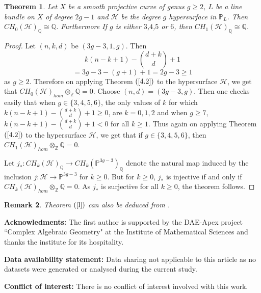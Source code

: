 \documentclass[12pt, reqno]{amsart}
\newtheorem{theorem}{Theorem}[section]
\newtheorem{remark}[theorem]{Remark}
\begin{document}
\begin{theorem}\label{l}
Let $X$ be a smooth projective curve of genus $g\geq 2$, $L$ be a line bundle on $X$ of degree $2g-1$ and $\mathcal{H}$ be the degree $g$ hypersurface in $\mathbb{P}_{L}$. Then $CH_{0}(\mathcal{H})_{\mathbb{Q}}\cong \mathbb{Q}$. Furthermore If $g$ is either $3$,$4$,$5$ or $6$, then $CH_{1}(\mathcal{H})_{\mathbb{Q}}\cong \mathbb{Q}$.
\end{theorem}
\begin{proof}
Let $(n,k,d)$ be $(3g-3,1,g)$. Then 
\[k(n-k+1)-\binom{d+k}{d}+1\]
\[=3g-3-(g+1)+1=2g-3\geq 1\]
as $g\geq 2$. Therefore on applying  Theorem $(\ref{4.2})$ to the hypersurface $\mathcal{H}$, we get that $CH_{0}(\mathcal{H})_{hom}\otimes_{\mathbb{Z}}\mathbb{Q}=0$. 
Choose $(n,d)=(3g-3,g)$. Then one checks easily that when $g\in\{3,4,5,6\}$, the only values of $k$ for which $k(n-k+1)-\binom{d+k}{d}+1\geq 0$, are $k=0,1,2$ and when $g\geq 7$, $k(n-k+1)-\binom{d+k}{d}+1< 0$ for all $k\geq 1$. Thus again on applying  Theorem $(\ref{4.2})$ to the hypersurface $\mathcal{H}$, we get that if $g\in\{3,4,5,6\}$, then $CH_{1}(\mathcal{H})_{hom}\otimes_{\mathbb{Z}}\mathbb{Q}=0$. 

Let $j_{*}:CH_{k}(\mathcal{H})_{\mathbb{Q}}\rightarrow CH_{k}(\mathbb{P}^{3g-3})_{\mathbb{Q}}$ denote the natural map induced by the inclusion $j:\mathcal{H}\rightarrow \mathbb{P}^{3g-3}$ for $k\geq 0$. But for $k\geq 0$, $j_{*}$ is injective if and only if $CH_{k}(\mathcal{H})_{hom}\otimes_{\mathbb{Z}}\mathbb{Q}=0$. As $j_{*}$ is surjective for all $k\geq 0$, the theorem follows.
\end{proof}
\begin{remark}
Theorem $(\ref{l})$ can also be deduced from \cite[Theorem $(1.5)$]{hi}.
\end{remark}


{\bf Acknowledments:}
The first author is supported by the DAE-Apex project ``Complex Algebraic Geometry" at the Institute of Mathematical Sciences and thanks the institute for its hospitality.

{\bf Data availability statement:}
Data sharing not applicable to this article as no datasets were generated or analysed during the current study.

{\bf Conflict of interest:}
There is no conflict of interest involved with this work.
\end{document}
